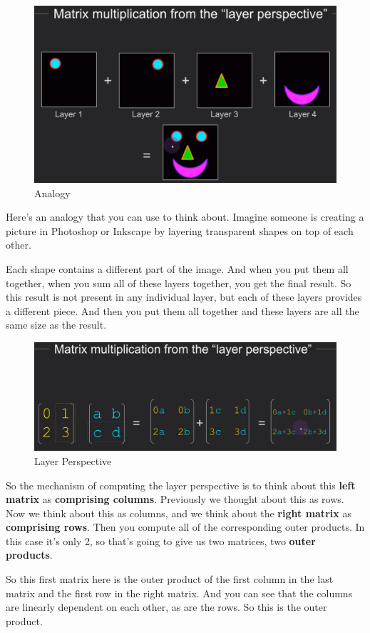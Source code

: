 \documentclass[fleqn,10pt]{olplainarticle}
\theoremstyle{definition}
\theoremstyle{remark}
\begin{document}
\begin{figure}[ht]
	\centering
	\includegraphics[width=0.7\linewidth]{images/multi-02.png}
	\caption{Analogy}
	\label{fig:multi_02}
\end{figure}

Here's an analogy that you can use to think about. Imagine someone is creating a picture in Photoshop or Inkscape by layering transparent shapes on top of each other.

Each shape contains a different part of the image. And when you put them all together, when you sum all of these layers together, you get the final result. So this result is not present in any individual layer, but each of these layers provides a different
piece. And then you put them all together and these layers are all the same size as the result. 

\begin{figure}[ht]
	\centering
	\includegraphics[width=0.7\linewidth]{images/multi-03.png}
	\caption{Layer Perspective}
	\label{fig:multi_03}
\end{figure}

So the mechanism of computing the layer perspective is to think about this \textbf{left matrix} as \textbf{comprising columns}. Previously we thought about this as rows. Now we think about this as columns, and we think about the \textbf{right matrix} as \textbf{comprising rows}. Then you compute all of the corresponding outer products. In this case it's only 2, so that's going to give us two matrices, two \textbf{outer products}.

So this first matrix here is the outer product of the first column in the last matrix and the first row in the right matrix. And you can see that the columns are linearly dependent on each other, as are the rows. So this is the outer product.
\end{document}
